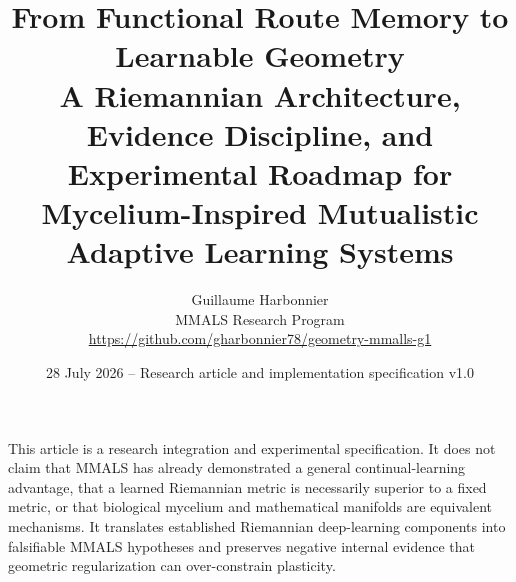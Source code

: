 \documentclass[10pt,a4paper]{article}
\title{\textbf{From Functional Route Memory to Learnable Geometry}\\[0.4em]
\large A Riemannian Architecture, Evidence Discipline, and Experimental Roadmap for Mycelium-Inspired Mutualistic Adaptive Learning Systems}
\author{Guillaume Harbonnier\\MMALS Research Program\\\small \url{https://github.com/gharbonnier78/geometry-mmalls-g1}}
\date{28 July 2026 -- Research article and implementation specification v1.0}
\newcommand{\MMALS}{\textsc{MMALS}}
\begin{document}
\maketitle

\begin{statusbox}
This article is a research integration and experimental specification. It does not claim that \MMALS{} has already demonstrated a general continual-learning advantage, that a learned Riemannian metric is necessarily superior to a fixed metric, or that biological mycelium and mathematical manifolds are equivalent mechanisms. It translates established Riemannian deep-learning components into falsifiable \MMALS{} hypotheses and preserves negative internal evidence that geometric regularization can over-constrain plasticity.
\end{statusbox}
\end{document}

